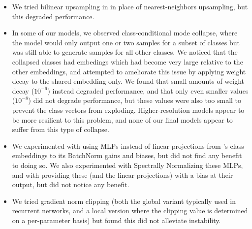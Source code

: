 \begin{itemize}
\item We tried bilinear upsampling in \gen{} in place of nearest-neighbors upsampling, but this degraded performance.
\item In some of our models, we observed class-conditional mode collapse, where the model would only output one or two samples for a subset of classes but was still able to generate samples for all other classes. We noticed that the collapsed classes had embedings which had become very large relative to the other embeddings, and attempted to ameliorate this issue by applying weight decay to the shared embedding only. We found that small amounts of weight decay ($10^{-6}$) instead degraded performance, and that only even smaller values ($10^{-8}$) did not degrade performance, but these values were also too small to prevent the class vectors from exploding. Higher-resolution models appear to be more resilient to this problem, and none of our final models appear to suffer from this type of collapse.

\item We experimented with using MLPs instead of linear projections from \gen{}'s class embeddings to its BatchNorm gains and biases, but did not find any benefit to doing so. We also experimented with Spectrally Normalizing these MLPs, and with providing these (and the linear projections) with a bias at their output, but did not notice any benefit.

\item We tried gradient norm clipping (both the global variant typically used in recurrent networks, and a local version where the clipping value is determined on a per-parameter basis) but found this did not alleviate instability.


\end{itemize}

